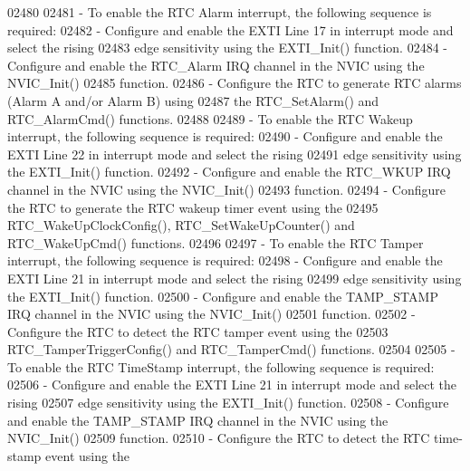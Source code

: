 \begin{DoxyCode}
02480 \textcolor{comment}{ }
02481 \textcolor{comment}{ - To enable the RTC Alarm interrupt, the following sequence is required:}
02482 \textcolor{comment}{   - Configure and enable the EXTI Line 17 in interrupt mode and select the rising }
02483 \textcolor{comment}{     edge sensitivity using the EXTI\_Init() function.}
02484 \textcolor{comment}{   - Configure and enable the RTC\_Alarm IRQ channel in the NVIC using the NVIC\_Init()}
02485 \textcolor{comment}{     function.}
02486 \textcolor{comment}{   - Configure the RTC to generate RTC alarms (Alarm A and/or Alarm B) using}
02487 \textcolor{comment}{     the RTC\_SetAlarm() and RTC\_AlarmCmd() functions.}
02488 \textcolor{comment}{}
02489 \textcolor{comment}{ - To enable the RTC Wakeup interrupt, the following sequence is required:}
02490 \textcolor{comment}{   - Configure and enable the EXTI Line 22 in interrupt mode and select the rising }
02491 \textcolor{comment}{     edge sensitivity using the EXTI\_Init() function.}
02492 \textcolor{comment}{   - Configure and enable the RTC\_WKUP IRQ channel in the NVIC using the NVIC\_Init()}
02493 \textcolor{comment}{     function.}
02494 \textcolor{comment}{   - Configure the RTC to generate the RTC wakeup timer event using the }
02495 \textcolor{comment}{     RTC\_WakeUpClockConfig(), RTC\_SetWakeUpCounter() and RTC\_WakeUpCmd() functions.}
02496 \textcolor{comment}{}
02497 \textcolor{comment}{ - To enable the RTC Tamper interrupt, the following sequence is required:}
02498 \textcolor{comment}{   - Configure and enable the EXTI Line 21 in interrupt mode and select the rising }
02499 \textcolor{comment}{     edge sensitivity using the EXTI\_Init() function.}
02500 \textcolor{comment}{   - Configure and enable the TAMP\_STAMP IRQ channel in the NVIC using the NVIC\_Init()}
02501 \textcolor{comment}{     function.}
02502 \textcolor{comment}{   - Configure the RTC to detect the RTC tamper event using the }
02503 \textcolor{comment}{     RTC\_TamperTriggerConfig() and RTC\_TamperCmd() functions.}
02504 \textcolor{comment}{}
02505 \textcolor{comment}{ - To enable the RTC TimeStamp interrupt, the following sequence is required:}
02506 \textcolor{comment}{   - Configure and enable the EXTI Line 21 in interrupt mode and select the rising }
02507 \textcolor{comment}{     edge sensitivity using the EXTI\_Init() function.}
02508 \textcolor{comment}{   - Configure and enable the TAMP\_STAMP IRQ channel in the NVIC using the NVIC\_Init()}
02509 \textcolor{comment}{     function.}
02510 \textcolor{comment}{   - Configure the RTC to detect the RTC time-stamp event using the }

\end{DoxyCode}
